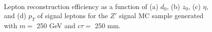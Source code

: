 \begin{figure}[!htb]
    \centering
     \\
    \caption{Lepton reconstruction efficiency as a function of (a) $d_{0}$, (b) $z_{0}$, (c) $\eta$, and (d) $p_{T}$ of signal leptons for the $Z'$ signal MC sample generated with $m=$ 250 GeV and $c\tau=$ 250 mm.}
    \label{fig:lepton_eff}
\end{figure}

